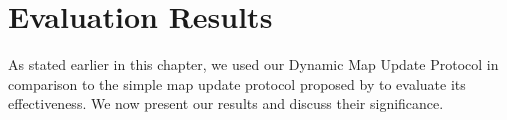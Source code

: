 \section{Evaluation Results}



As stated earlier in this chapter, we used our Dynamic Map Update Protocol in comparison to the simple map update protocol proposed by \citet{bastiaensen2003actmap} to evaluate its effectiveness. We now present our results and discuss their significance.

